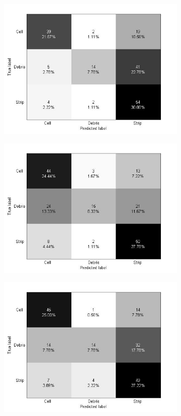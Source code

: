 \begin{figure}[!h]
\begin{subfigure}[b]{0.3\textwidth}
    \includegraphics[width=\textwidth]{confusion_matrix/fig3_4c.jpg}
    \caption{}
  \end{subfigure}
  \begin{subfigure}[b]{0.3\textwidth}
    \includegraphics[width=\textwidth]{confusion_matrix/fig3_4d.jpg}
    \caption{}
  \end{subfigure}
  \begin{subfigure}[b]{0.3\textwidth}
    \includegraphics[width=\textwidth]{confusion_matrix/fig3_4e.jpg}

\end{subfigure}
\end{figure}
